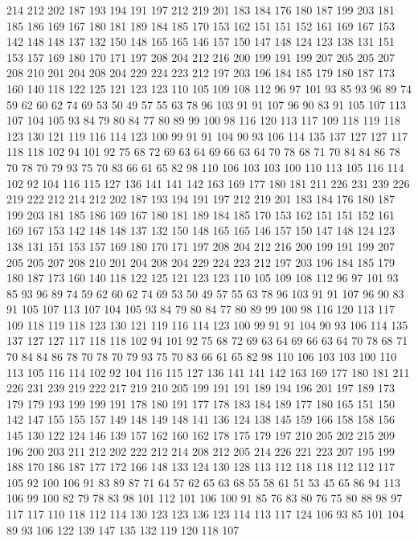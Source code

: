 214 212 202 187 193 194 191 197 212 219 201 183 184 176 180 187 199 203 181 185
186 169 167 180 181 189 184 185 170 153 162 151 151 152 161 169 167 153 142 148
148 137 132 150 148 165 165 146 157 150 147 148 124 123 138 131 151 153 157 169
180 170 171 197 208 204 212 216 200 199 191 199 207 205 205 207 208 210 201 204
208 204 229 224 223 212 197 203 196 184 185 179 180 187 173 160 140 118 122 125
121 123 123 110 105 109 108 112 96 97 101 93 85 93 96 89 74 59 62 60
62 74 69 53 50 49 57 55 63 78 96 103 91 91 107 96 90 83 91 105
107 113 107 104 105 93 84 79 80 84 77 80 89 99 100 98 116 120 113 117
109 118 119 118 123 130 121 119 116 114 123 100 99 91 91 104 90 93 106 114
135 137 127 127 117 118 118 102 94 101 92 75 68 72 69 63 64 69 66 63
64 70 78 68 71 70 84 84 86 78 70 78 70 79 93 75 70 83 66 61
65 82 98 110 106 103 103 100 110 113 105 116 114 102 92 104 116 115 127 136
141 141 142 163 169 177 180 181 211 226 231 239 226 219 222 212 214 212 202 187
193 194 191 197 212 219 201 183 184 176 180 187 199 203 181 185 186 169 167 180
181 189 184 185 170 153 162 151 151 152 161 169 167 153 142 148 148 137 132 150
148 165 165 146 157 150 147 148 124 123 138 131 151 153 157 169 180 170 171 197
208 204 212 216 200 199 191 199 207 205 205 207 208 210 201 204 208 204 229 224
223 212 197 203 196 184 185 179 180 187 173 160 140 118 122 125 121 123 123 110
105 109 108 112 96 97 101 93 85 93 96 89 74 59 62 60 62 74 69 53
50 49 57 55 63 78 96 103 91 91 107 96 90 83 91 105 107 113 107 104
105 93 84 79 80 84 77 80 89 99 100 98 116 120 113 117 109 118 119 118
123 130 121 119 116 114 123 100 99 91 91 104 90 93 106 114 135 137 127 127
117 118 118 102 94 101 92 75 68 72 69 63 64 69 66 63 64 70 78 68
71 70 84 84 86 78 70 78 70 79 93 75 70 83 66 61 65 82 98 110
106 103 103 100 110 113 105 116 114 102 92 104 116 115 127 136 141 141 142 163
169 177 180 181 211 226 231 239 219 222 217 219 210 205 199 191 191 189 194 196
201 197 189 173 179 179 193 199 199 191 178 180 191 177 178 183 184 189 177 180
165 151 150 142 147 155 155 157 149 148 149 148 141 136 124 138 145 159 166 158
158 156 145 130 122 124 146 139 157 162 160 162 178 175 179 197 210 205 202 215
209 196 200 203 211 212 202 222 212 214 208 212 205 214 226 221 223 207 195 199
188 170 186 187 177 172 166 148 133 124 130 128 113 112 118 118 112 112 117 105
92 100 106 91 83 89 87 71 64 57 62 65 63 68 55 58 61 51 53 45
65 86 94 113 106 99 100 82 79 78 83 98 101 112 101 106 100 91 85 76
83 80 76 75 80 88 98 97 117 117 110 118 112 114 130 123 123 136 123 114
113 117 124 106 93 85 101 104 89 93 106 122 139 147 135 132 119 120 118 107
